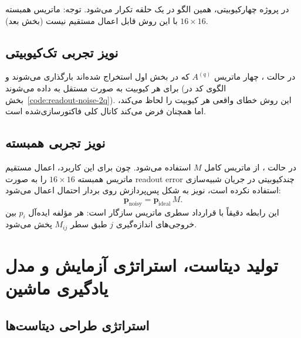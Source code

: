 
در پروژه چهارکیوبیتی، همین الگو در یک حلقه تکرار می‌شود. توجه: ماتریس همبسته $16\times16$ با این روش قابل اعمال مستقیم نیست (بخش بعد).

\subsection*{نویز تجربی تک‌کیوبیتی}

در حالت ، چهار ماتریس $A^{(q)}$ که در بخش اول استخراج شده‌اند بارگذاری می‌شوند و برای هر کیوبیت به صورت مستقل به  داده می‌شوند (الگوی کد در بخش~\ref{code:readout-noise-2q}).
این روش خطای واقعی هر کیوبیت را لحاظ می‌کند، اما همچنان فرض می‌کند کانال کلی فاکتورسازی‌شده است.

\subsection*{نویز تجربی همبسته}

در حالت ، از ماتریس کامل $M$ استفاده می‌شود. چون  برای این کاربرد، اعمال مستقیم ماتریس همبسته $16\times16$ را به صورت readout error چندکیوبیتی در جریان شبیه‌سازی استفاده نکرده است، نویز به شکل پس‌پردازش روی بردار احتمال اعمال می‌شود:
\begin{equation}
	\mathbf{p}_{\mathrm{noisy}}
	=
	\mathbf{p}_{\mathrm{ideal}}\,M.
	\label{eq:correlated-application}
\end{equation}
این رابطه دقیقاً با قرارداد سطری ماتریس سازگار است: هر مؤلفه ایده‌آل $p_i$ بین خروجی‌های اندازه‌گیری $j$ طبق سطر $M_{ij}$ پخش می‌شود.

\section*{تولید دیتاست، استراتژی آزمایش و مدل یادگیری ماشین}

\subsection*{استراتژی طراحی دیتاست‌ها}

